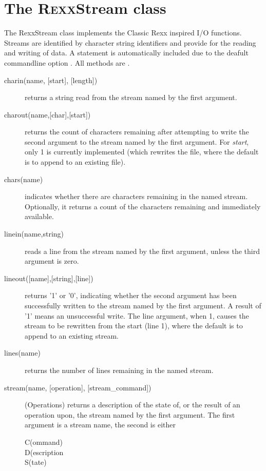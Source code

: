 \section{The R\textsc{exx}Stream class}\label{refrexxstream}

The RexxStream class implements the Classic Rexx inspired I/O
functions. Streams are identified by character string identifiers and
provide for the reading and writing of data. A  statement is
automatically included due to the deafult commandline option . All methods are .

\begin{description}
  
\item[charin(name, [start{]}, [length{]})] returns a string read from the stream named by the first
argument.
\item[charout(name,[char{]},[start{]})] returns the count of characters remaining after attempting to
write the second argument to the stream named by the first
argument. For \emph{start}, only 1 is currently implemented (which
rewrites the file, where the default is to append to an existing file). 
\item[chars(name)] indicates whether there are characters remaining in the named
stream. Optionally, it returns a count of the characters remaining and
immediately available.
\item[linein(name,string)] reads a line from the stream named by the first argument,
unless the third argument is zero.
\item[lineout([name{]},[string{]},[line{]})] returns '1' or '0', indicating whether the
  second argument has been successfully written to the stream named by
  the first argument. A result of '1' means an unsuccessful write. The
  line argument, when 1, causes the stream to be rewritten from the
  start (line 1), where the default is to append to an existing stream. 
\item[lines(name)] returns the number of lines remaining in the named stream.

\item[stream(name, [operation{]}, [stream\_command{]})]    (Operations) returns a description of the state of, or the result of an
operation upon, the stream named by the first argument. The first
argument is a stream name, the second is either
\begin{description}
\item[C(ommand)]
\item[D(escription]
\item[S(tate)]
\end{description}


\end{description}

